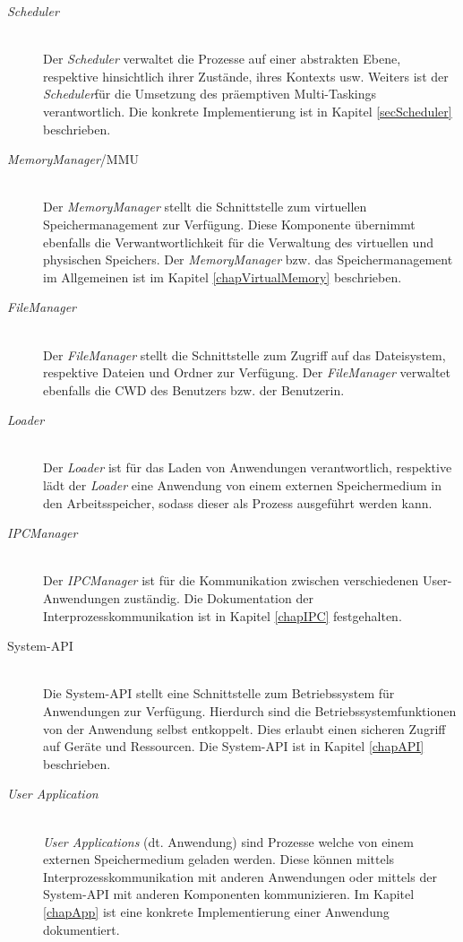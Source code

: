 \begin{description}
	\item[\textit{Scheduler}] \hfill \\
	Der \textit{Scheduler} verwaltet die Prozesse auf einer abstrakten Ebene, respektive hinsichtlich ihrer Zustände, ihres Kontexts usw. Weiters ist der \textit{Scheduler}für die Umsetzung des präemptiven Multi-Taskings verantwortlich. Die konkrete Implementierung ist in Kapitel \ref{secScheduler} beschrieben.
	
	\item[\textit{MemoryManager}/\ac{MMU}] \hfill \\
	Der \textit{MemoryManager} stellt die Schnittstelle zum virtuellen Speichermanagement zur Verfügung. Diese Komponente übernimmt ebenfalls die Verwantwortlichkeit für die Verwaltung des virtuellen und physischen Speichers. Der \textit{MemoryManager} bzw. das Speichermanagement im Allgemeinen ist im Kapitel \ref{chapVirtualMemory} beschrieben.

	\item[\textit{FileManager}] \hfill \\
	Der \textit{FileManager} stellt die Schnittstelle zum Zugriff auf das Dateisystem, respektive Dateien und Ordner zur Verfügung. Der \textit{FileManager} verwaltet ebenfalls die \ac{CWD} des Benutzers bzw. der Benutzerin.
	
	\item[\textit{Loader}] \hfill \\
	Der \textit{Loader} ist für das Laden von Anwendungen verantwortlich, respektive lädt der \textit{Loader} eine Anwendung von einem externen Speichermedium in den Arbeitsspeicher, sodass dieser als Prozess ausgeführt werden kann.
	
	\item[\textit{IPCManager}] \hfill \\
	Der \textit{IPCManager} ist für die Kommunikation zwischen verschiedenen User-Anwendungen zuständig. Die Dokumentation der Interprozesskommunikation ist in Kapitel \ref{chapIPC} festgehalten.
	
	\item[System-API] \hfill \\
	Die System-API stellt eine Schnittstelle zum Betriebssystem für Anwendungen zur Verfügung. Hierdurch sind die Betriebssystemfunktionen von der Anwendung selbst entkoppelt. Dies erlaubt einen sicheren Zugriff auf Geräte und Ressourcen. Die System-API ist in Kapitel \ref{chapAPI} beschrieben.
	
	\item[\textit{User Application}] \hfill \\
	\textit{User Applications} (dt. Anwendung) sind Prozesse welche von einem externen Speichermedium geladen werden. Diese können mittels Interprozesskommunikation mit anderen Anwendungen oder mittels der System-API mit anderen Komponenten kommunizieren. Im Kapitel \ref{chapApp} ist eine konkrete Implementierung einer Anwendung dokumentiert.
	

\end{description}
